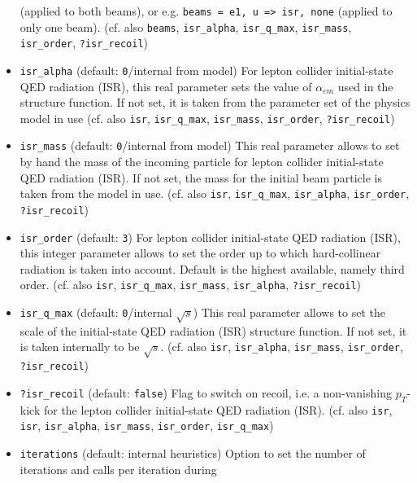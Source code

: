 \documentclass[12pt]{book}
\newcommand{\ttt}[1]{\texttt{#1}}
\begin{document}
\begin{itemize}
(applied to both beams), or e.g. \ttt{beams = e1, u => isr, none}
(applied to only one beam). (cf. also \ttt{beams}, \ttt{isr\_alpha},
\ttt{isr\_q\_max}, \ttt{isr\_mass}, \ttt{isr\_order}, 
\ttt{?isr\_recoil})
\item
\ttt{isr\_alpha} \qquad (default: \ttt{0}/internal from model)
\newline
For lepton collider initial-state QED radiation (ISR), this real parameter
sets the value of $\alpha_{em}$ used in the structure function. If not
set, it is taken from the parameter set of the physics model in use
(cf. also \ttt{isr}, \ttt{isr\_q\_max}, \ttt{isr\_mass}, \ttt{isr\_order},
\ttt{?isr\_recoil})
\item
\ttt{isr\_mass} \qquad (default: \ttt{0}/internal from model) \newline 
This real parameter allows to set by hand the mass of the incoming
particle for lepton collider initial-state QED radiation (ISR). If not
set, the mass for the initial beam particle is taken from the model in
use. (cf. also \ttt{isr}, \ttt{isr\_q\_max}, \ttt{isr\_alpha},
\ttt{isr\_order}, \ttt{?isr\_recoil})
\item
\ttt{isr\_order} \qquad (default: \ttt{3}) \newline
For lepton collider initial-state QED radiation (ISR), this integer
parameter allows to set the order up to which hard-collinear radiation
is taken into account. Default is the highest available, namely third
order. (cf. also \ttt{isr}, \ttt{isr\_q\_max}, \ttt{isr\_mass},
\ttt{isr\_alpha}, \ttt{?isr\_recoil})
\item
\ttt{isr\_q\_max} \qquad (default: \ttt{0}/internal $\sqrt{s}$)
\newline
This real parameter allows to set the scale of the initial-state
QED radiation (ISR) structure function. If not set, it is taken internally
to be $\sqrt{s}$.
(cf. also \ttt{isr}, \ttt{isr\_alpha}, \ttt{isr\_mass},
\ttt{isr\_order}, \ttt{?isr\_recoil})
\item
\ttt{?isr\_recoil} \qquad (default: \ttt{false}) \newline
Flag to switch on recoil, i.e. a non-vanishing $p_T$-kick for the
lepton collider initial-state QED radiation (ISR). 
(cf. also \ttt{isr}, \ttt{isr}, \ttt{isr\_alpha}, \ttt{isr\_mass},
\ttt{isr\_order}, \ttt{isr\_q\_max})
\item
\ttt{iterations} \qquad (default: internal heuristics) \newline
Option to set the number of iterations and calls per iteration during

\end{itemize}
\end{document}
